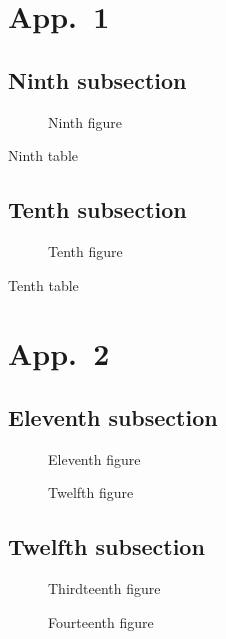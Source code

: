 \documentclass[oneside,12pt,a4paper]{article}
\begin{document}
\appendix
\section{App.~1}
\secttoc \mtcskip \sectlof \mtcskip \sectlot
\subsection{Ninth subsection}

\begin{figure}
\caption{Ninth figure}
\end{figure}
\begin{table}
\caption{Ninth table}
\end{table}

\subsection{Tenth subsection}

\begin{figure}
\caption{Tenth figure}
\end{figure}
\begin{table}
\caption{Tenth table}
\end{table}

\section{App.~2}
\secttoc \mtcskip \sectlof \mtcskip \sectlot
\subsection{Eleventh subsection}

\begin{figure}
\caption{Eleventh figure}
\end{figure}
\begin{figure}
\caption{Twelfth figure}
\end{figure}

\subsection{Twelfth subsection}

\begin{figure}
\caption{Thirdteenth figure}
\end{figure}
\begin{figure}
\caption{Fourteenth figure}
\end{figure}
\end{document}
